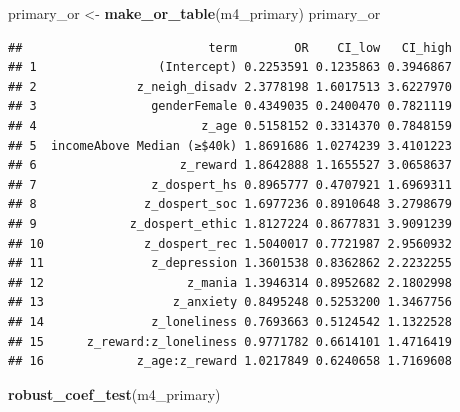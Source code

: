 \documentclass[
]{article}
\newenvironment{Shaded}{\begin{snugshade}}{\end{snugshade}}
\newcommand{\FunctionTok}[1]{\textcolor[rgb]{0.13,0.29,0.53}{\textbf{#1}}}
\newcommand{\NormalTok}[1]{#1}
\newcommand{\OtherTok}[1]{\textcolor[rgb]{0.56,0.35,0.01}{#1}}
\begin{document}
\begin{Shaded}
\begin{Highlighting}[]
\NormalTok{primary\_or }\OtherTok{\textless{}{-}} \FunctionTok{make\_or\_table}\NormalTok{(m4\_primary)}
\NormalTok{primary\_or}
\end{Highlighting}
\end{Shaded}

\begin{verbatim}
##                          term        OR    CI_low   CI_high
## 1                 (Intercept) 0.2253591 0.1235863 0.3946867
## 2              z_neigh_disadv 2.3778198 1.6017513 3.6227970
## 3                genderFemale 0.4349035 0.2400470 0.7821119
## 4                       z_age 0.5158152 0.3314370 0.7848159
## 5  incomeAbove Median (≥$40k) 1.8691686 1.0274239 3.4101223
## 6                    z_reward 1.8642888 1.1655527 3.0658637
## 7                z_dospert_hs 0.8965777 0.4707921 1.6969311
## 8               z_dospert_soc 1.6977236 0.8910648 3.2798679
## 9             z_dospert_ethic 1.8127224 0.8677831 3.9091239
## 10              z_dospert_rec 1.5040017 0.7721987 2.9560932
## 11               z_depression 1.3601538 0.8362862 2.2232255
## 12                    z_mania 1.3946314 0.8952682 2.1802998
## 13                  z_anxiety 0.8495248 0.5253200 1.3467756
## 14               z_loneliness 0.7693663 0.5124542 1.1322528
## 15      z_reward:z_loneliness 0.9771782 0.6614101 1.4716419
## 16             z_age:z_reward 1.0217849 0.6240658 1.7169608
\end{verbatim}

\begin{Shaded}
\begin{Highlighting}[]
\FunctionTok{robust\_coef\_test}\NormalTok{(m4\_primary)}
\end{Highlighting}
\end{Shaded}
\end{document}
